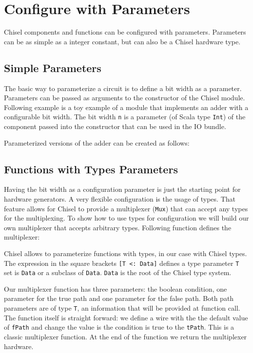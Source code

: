 \documentclass[%
    10pt,
    headinclude, footexclude,
    openright, %
    notitlepage,
    cleardoubleempty,
    headsepline,
    pointlessnumbers,
    bibtotoc, idxtotoc,
    ]{scrbook}
\newcommand{\code}[1]{{\small{\texttt{#1}}}}
\begin{document}
\section{Configure with Parameters}

Chisel components and functions can be configured with parameters.
Parameters can be as simple as a integer constant, but can also be a Chisel
hardware type.

\subsection{Simple Parameters}

The basic way to parameterize a circuit is to define a bit width as a parameter.
Parameters can be passed as arguments to
the constructor of the Chisel module. Following example is a toy example of
a module that implements an adder with a configurable bit width.
The bit width \code{n} is a parameter (of Scala type \code{Int}) of the component
passed into the constructor that can be used in the IO bundle.


\noindent Parameterized versions of the adder can be created as follows:


\subsection{Functions with Types Parameters}

Having the bit width as a configuration parameter is just the starting point for
hardware generators. A very flexible configuration is the usage of types.
That feature allows for Chisel to provide a multiplexer (\code{Mux}) that
can accept any types for the multiplexing.
To show how to use types for configuration we will build our own multiplexer
that accepts arbitrary types. Following function defines the multiplexer:


Chisel allows to parameterize functions with types, in our case with Chisel
types. The expression in the square brackets \code{[T <: Data]} defines
a type parameter \code{T} set is \code{Data} or a subclass of \code{Data}.
\code{Data} is the root of the Chisel type system.

Our multiplexer function has three parameters: the boolean condition,
one parameter for the true path and one parameter for the false path.
Both path parameters are of type \code{T}, an information that will be
provided at function call. The function itself is straight forward:
we define a wire with the the default value of \code{fPath} and
change the value is the condition is true to the \code{tPath}.
This is a classic multiplexer function.
At the end of the function we return the multiplexer hardware.
\end{document}
